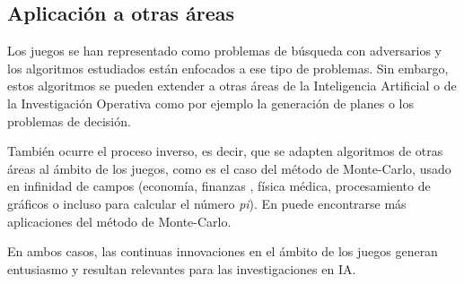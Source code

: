 \subsection{Aplicación a otras áreas}
\label{ssec:aplicacion_areas}
Los juegos se han representado como problemas de búsqueda con adversarios y los algoritmos estudiados están enfocados a ese tipo de problemas.
Sin embargo, estos algoritmos se pueden extender a otras áreas de la Inteligencia Artificial o de la Investigación Operativa como por ejemplo la generación de planes o los problemas de decisión.

También ocurre el proceso inverso, es decir, que se adapten algoritmos de otras áreas al ámbito de los juegos, como es el caso del método de Monte-Carlo, usado en infinidad de campos (economía, finanzas , física médica, procesamiento de gráficos  o incluso para calcular el número \textit{pi}). 
En  puede encontrarse más aplicaciones del método de Monte-Carlo.

En ambos casos, las continuas innovaciones en el ámbito de los juegos generan entusiasmo y resultan relevantes para las investigaciones en IA.
